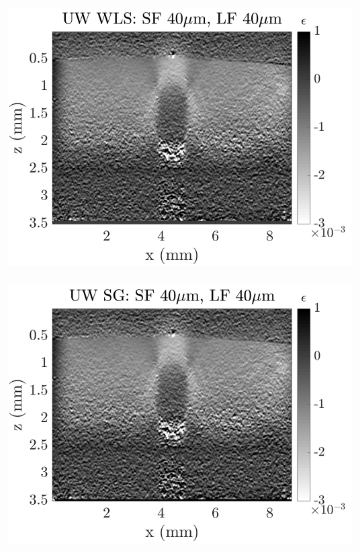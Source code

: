 \begin{figure}[h]
	\centering
    \begin{subfigure}{0.49\textwidth}
    	\centering
        \includegraphics[width=\textwidth]{appendix_figs/wls_fr40_lr40.png}
    \end{subfigure}
    \begin{subfigure}{0.49\textwidth}
    	\centering
        \includegraphics[width=\textwidth]{appendix_figs/uwsg_fr40_lr40.png}
    \end{subfigure}
    \\
    \begin{subfigure}{0.49\textwidth}
    	\centering

\end{subfigure}
\end{figure}
